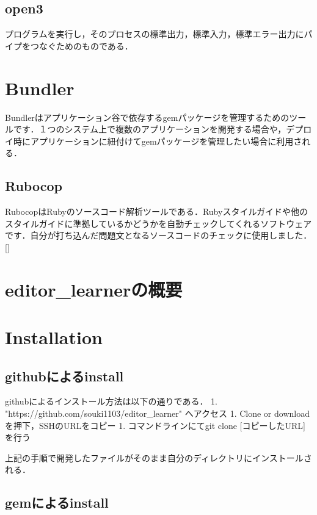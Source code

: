     \subsection{open3}\label{open3}

    プログラムを実行し，そのプロセスの標準出力，標準入力，標準エラー出力にパイプをつなぐためのものである．

    \section{Bundler}\label{bundler}

Bundlerはアプリケーション谷で依存するgemパッケージを管理するためのツールです．１つのシステム上で複数のアプリケーションを開発する場合や，デプロイ時にアプリケーションに紐付けてgemパッケージを管理したい場合に利用される．

    \subsection{Rubocop}\label{rubocop}

RubocopはRubyのソースコード解析ツールである．Rubyスタイルガイドや他のスタイルガイドに準拠しているかどうかを自動チェックしてくれるソフトウェアです．自分が打ち込んだ問題文となるソースコードのチェックに使用しました．{[}{]}

    \section{editor\_learnerの概要}\label{editor_learnerux306eux6982ux8981}

    \section{Installation}\label{installation}

\subsection{githubによるinstall}\label{githubux306bux3088ux308binstall}

githubによるインストール方法は以下の通りである． 1.
"https://github.com/souki1103/editor\_learner" へアクセス 1. Clone or
downloadを押下，SSHのURLをコピー 1. コマンドラインにてgit clone
{[}コピーしたURL{]}を行う

上記の手順で開発したファイルがそのまま自分のディレクトリにインストールされる．

\subsection{gemによるinstall}\label{gemux306bux3088ux308binstall}

